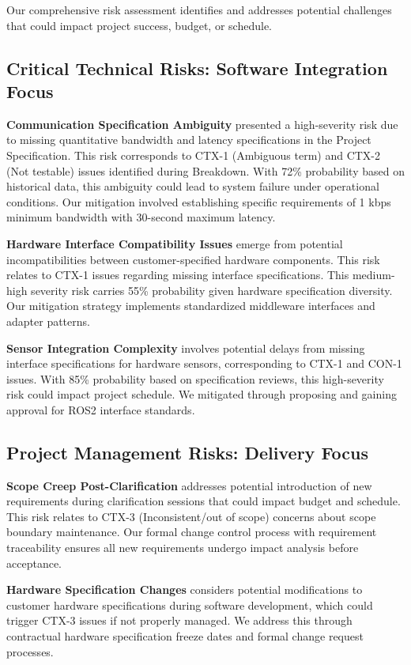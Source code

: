 \documentclass[12pt,a4paper]{article}
\begin{document}
Our comprehensive risk assessment identifies and addresses potential challenges that could impact project success, budget, or schedule.

\subsection{Critical Technical Risks: Software Integration Focus}

\textbf{Communication Specification Ambiguity} presented a high-severity risk due to missing quantitative bandwidth and latency specifications in the Project Specification. This risk corresponds to CTX-1 (Ambiguous term) and CTX-2 (Not testable) issues identified during Breakdown. With 72\% probability based on historical data, this ambiguity could lead to system failure under operational conditions. Our mitigation involved establishing specific requirements of 1 kbps minimum bandwidth with 30-second maximum latency.

\textbf{Hardware Interface Compatibility Issues} emerge from potential incompatibilities between customer-specified hardware components. This risk relates to CTX-1 issues regarding missing interface specifications. This medium-high severity risk carries 55\% probability given hardware specification diversity. Our mitigation strategy implements standardized middleware interfaces and adapter patterns.

\textbf{Sensor Integration Complexity} involves potential delays from missing interface specifications for hardware sensors, corresponding to CTX-1 and CON-1 issues. With 85\% probability based on specification reviews, this high-severity risk could impact project schedule. We mitigated through proposing and gaining approval for ROS2 interface standards.

\subsection{Project Management Risks: Delivery Focus}

\textbf{Scope Creep Post-Clarification} addresses potential introduction of new requirements during clarification sessions that could impact budget and schedule. This risk relates to CTX-3 (Inconsistent/out of scope) concerns about scope boundary maintenance. Our formal change control process with requirement traceability ensures all new requirements undergo impact analysis before acceptance.

\textbf{Hardware Specification Changes} considers potential modifications to customer hardware specifications during software development, which could trigger CTX-3 issues if not properly managed. We address this through contractual hardware specification freeze dates and formal change request processes.
\end{document}
